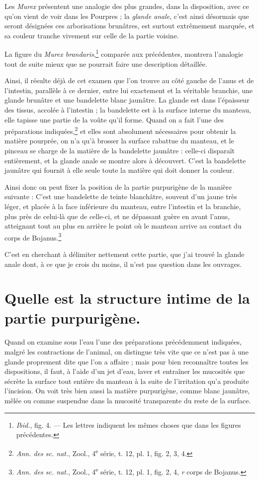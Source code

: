 \documentclass[a4paper, 11pt, oneside, polutonikogreek, french]{article}
\begin{document}
Les \emph{Murex} présentent une analogie des plus grandes, dans la disposition, avec ce qu'on vient de voir dans les Pourpres ; la \emph{glande anale}, c'est ainsi désormais que seront désignées ces arborisations brunâtres, est surtout extrêmement marquée, et sa couleur tranche vivement sur celle de la partie voisine.

La figure du \emph{Murex brandaris},\footnote{\emph{Ibid.}, fig. 4. --- Les lettres indiquent les mêmes choses que dans les figures précédentes.} comparée aux précédentes, montrera l'analogie tout de suite mieux que ne pourrait faire une description détaillée.

Ainsi, il résulte déjà de cet examen que l'on trouve au côté gauche de l'anus et de l'intestin, parallèle à ce dernier, entre lui exactement et la véritable branchie, une glande brunâtre et une bandelette blanc jaunâtre. La glande est dans l'épaisseur des tissus, accolée à l'intestin ; la bandelette est à la surface interne du manteau, elle tapisse une partie de la voûte qu'il forme. Quand on a fait l'une des préparations indiquées,\footnote{\emph{Ann. des sc. nat.}, Zool., 4\textsuperscript{e} série, t. 12, pl. 1, fig. 2, 3, 4.} et elles sont absolument nécessaires pour obtenir la matière pourprée, on n'a qu'à brosser la surface rabattue du manteau, et le pinceau se charge de la matière de la bandelette jaunâtre : celle-ci disparaît entièrement, et la glande anale se montre alors à découvert. C'est la bandelette jaunâtre qui fournit à elle seule toute la matière qui doit donner la couleur.

Ainsi donc on peut fixer la position de la partie purpurigène de la manière suivante : C'est une bandelette de teinte blanchâtre, souvent d'un jaune très léger, et placée à la face inférieure du manteau, entre l'intestin et la branchie, plus près de celui-là que de celle-ci, et ne dépassant guère en avant l'anus, atteignant tout au plus en arrière le point où le manteau arrive au contact du corps de Bojanus.\footnote{\emph{Ann. des sc. nat.}, Zool., 4\textsuperscript{e} série, t. 12, pl. 1, fig. 2, 4, \emph{r} corps de Bojanus.}

C'est en cherchant à délimiter nettement cette partie, que j'ai trouvé la glande anale dont, à ce que je crois du moins, il n'est pas question dans les ouvrages.
\clearpage
\section{Quelle est la structure intime de la partie purpurigène.}
\paragraph{}
Quand on examine sous l'eau l'une des préparations précédemment indiquées, malgré les contractions de l'animal, on distingue très vite que ce n'est pas à une glande proprement dite que l'on a affaire ; mais pour bien reconnaître toutes les dispositions, il faut, à l'aide d'un jet d'eau, laver et entraîner les mucosités que sécrète la surface tout entière du manteau à la suite de l'irritation qu'a produite l'incision. On voit très bien aussi la matière purpurigène, comme blanc jaunâtre, mêlée ou comme suspendue dans la mucosité transparente du reste de la surface.
\end{document}
